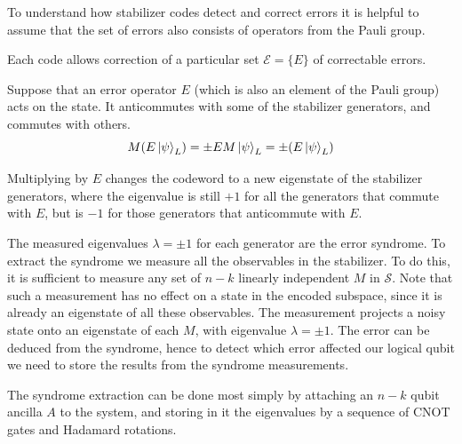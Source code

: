To understand how stabilizer codes detect and correct errors it is helpful to assume that the set of errors also consists of operators from the Pauli group. 

Each code allows correction of a particular set $\mathcal{E}=\{E\}$ of correctable errors.

Suppose that an error operator $E$ (which is also an element of the Pauli group) acts on the state. It anticommutes with some of the stabilizer generators, and commutes with others.
\begin{equation}
    M(E\ket{\psi}_L) = \pm EM\ket{\psi}_L = \pm (E\ket{\psi}_L)
    \label{eq:stabcond}
\end{equation}

Multiplying by $E$ changes the codeword to a new eigenstate of the stabilizer generators, where the eigenvalue is still $+1$ for all the generators that commute with $E$, but is $-1$ for those generators that anticommute with $E$.

The measured eigenvalues $\lambda=\pm 1$ for each generator are the error syndrome.
To extract the syndrome we measure all the observables in the stabilizer. To do this, it is sufficient to measure any set of $n-k$ linearly independent $M$ in $\mathcal{S}$. Note that such a measurement has no effect on a state in the encoded subspace, since it is already an eigenstate of all these observables. The measurement projects a noisy state onto an eigenstate of each $M$, with eigenvalue $\lambda=\pm 1$.
The error can be deduced from the syndrome, hence to detect which error affected our logical qubit we need to store the results from the syndrome measurements. 

The syndrome extraction can be done most simply by attaching an $n-k$ qubit ancilla $A$ to the system, and storing in it the eigenvalues by a sequence of CNOT gates and Hadamard rotations.

